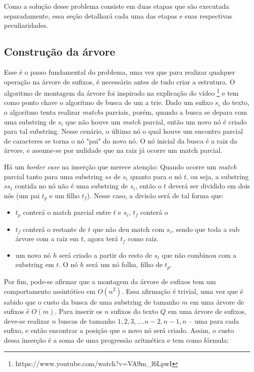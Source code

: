 Como a solução desse problema consiste em duas etapas que são executada
separadamente, essa seção detalhará cada uma das etapas e suas respectivas
peculiaridades.

\subsection{Construção da árvore} 
Esse é o passo fundamental do problema, uma vez que para realizar qualquer
operação na árvore de sufixos, é necessário antes de tudo criar a
estrutura.
O algoritmo de montagem da árvore foi inspirado na explicação do vídeo
\footnote{https://www.youtube.com/watch?v=VA9m\_l6LpwI}
e tem como ponto chave o algoritmo de busca de um a trie.
Dado um sufixo $s_i$ do texto, o algoritmo tenta realizar \textit{matchs}
parciais, porém, quando a busca se depara com uma substring de $s_i$ que não
houve um \textit{match} parcial, então um novo nó é criado para tal substring.
Nesse cenário, o último nó o qual houve um encontro parcial de caracteres se
torna o nó "pai" do novo nó.
O nó inicial da busca é a raiz da árvore, e assume-se por nulidade que na raiz
já ocorre um match parcial.

Há um \textit{border case} na inserção que merece atenção:
Quando ocorre um \textit{match} parcial tanto para uma substring $ss$ de $s_i$
quanto para o nó $t$, ou seja, a substring $ss_t$ contida no nó não é uma
substring de $s_i$, então o $t$ deverá ser dividido em dois nós (um pai $t_p$ e
um filho $t_f$).
Nesse caso, a divisão será de tal forma que:
\begin{itemize}
    \item $t_p$ conterá o match parcial entre $t$ e $s_i$, $t_f$ conterá o
    \item $t_f$ conterá o restante de $t$ que não deu match com $s_i$, sendo que
    toda a sub árvore com a raiz em $t$, agora terá $t_f$ como raiz.
    \item um novo nó $h$ será criado a partir do resto de $s_i$ que não combinou
    com a substring em $t$. O nó $h$ será um nó folha, filho de $t_p$.
\end{itemize}

Por fim, pode-se afirmar que a montagem da árvore de sufixos tem um comportamento
assintótico em $O(n^2)$.
Essa afirmação é trivial, uma vez que é sabido que o custo da busca de uma
substring de tamanho $m$ em uma árvore de sufixos é $O(m)$.
Para inserir os $n$ sufixos do texto $Q$ em uma árvore de sufixos, deve-se
realizar $n$ buscas de tamanho $1, 2, 3, .... n-2, n-1, n$ -- uma para cada
sufixo, e então encontrar a posição que o novo nó será criado.
Assim, o custo dessa inserção é a soma de uma progressão aritmética e tem como
fórmula: 

